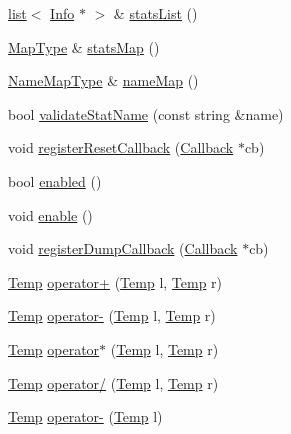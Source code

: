 \begin{DoxyCompactItemize}
\item 
\hyperlink{classstd_1_1list}{list}$<$ \hyperlink{classStats_1_1Info}{Info} $\ast$ $>$ \& \hyperlink{namespaceStats_aa77032793ad2536948870c4a48553c67}{statsList} ()
\item 
\hyperlink{namespaceStats_a2cc2598bf16648653f0799b7dd5b5098}{MapType} \& \hyperlink{namespaceStats_a021e4926d541f56c518e0be77bbdb615}{statsMap} ()
\item 
\hyperlink{namespaceStats_a45a78e2268e9f18065a10879d43f0db4}{NameMapType} \& \hyperlink{namespaceStats_afb176e85b0894034fbc81210827060d9}{nameMap} ()
\item 
bool \hyperlink{namespaceStats_a6bae8e555771c8cb0819d78c60359656}{validateStatName} (const string \&name)
\item 
void \hyperlink{namespaceStats_a3b9643eddeef663a234d6cfa2bcf06f2}{registerResetCallback} (\hyperlink{classCallback}{Callback} $\ast$cb)
\item 
bool \hyperlink{namespaceStats_acafb7271189f6d844921794d61cd608a}{enabled} ()
\item 
void \hyperlink{namespaceStats_a486f22824bd83c5308a0d70ffac6f758}{enable} ()
\item 
void \hyperlink{namespaceStats_a4530b3818e2e1811b7ad063fe38bedc1}{registerDumpCallback} (\hyperlink{classCallback}{Callback} $\ast$cb)
\item 
\hyperlink{classStats_1_1Temp}{Temp} \hyperlink{namespaceStats_ad753c7cf585098bfeb9428b578549f6d}{operator+} (\hyperlink{classStats_1_1Temp}{Temp} l, \hyperlink{classStats_1_1Temp}{Temp} r)
\item 
\hyperlink{classStats_1_1Temp}{Temp} \hyperlink{namespaceStats_a9f11fd33efc0c7c48e3bf613faa5f859}{operator-\/} (\hyperlink{classStats_1_1Temp}{Temp} l, \hyperlink{classStats_1_1Temp}{Temp} r)
\item 
\hyperlink{classStats_1_1Temp}{Temp} \hyperlink{namespaceStats_a0f00b6da1f44e697da7eccba495d94ef}{operator$\ast$} (\hyperlink{classStats_1_1Temp}{Temp} l, \hyperlink{classStats_1_1Temp}{Temp} r)
\item 
\hyperlink{classStats_1_1Temp}{Temp} \hyperlink{namespaceStats_a4503ae7ebd767375e5beef0eb2090eb0}{operator/} (\hyperlink{classStats_1_1Temp}{Temp} l, \hyperlink{classStats_1_1Temp}{Temp} r)
\item 
\hyperlink{classStats_1_1Temp}{Temp} \hyperlink{namespaceStats_aa6b877c1ac1451430742f23cdd1a6690}{operator-\/} (\hyperlink{classStats_1_1Temp}{Temp} l)
\item 

\end{DoxyCompactItemize}
